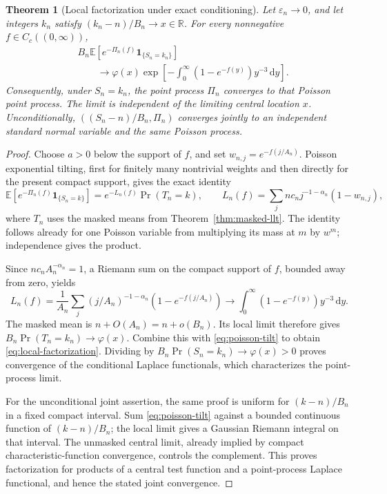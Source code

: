\documentclass[11pt,a4paper]{article}
\numberwithin{equation}{section}
\newtheorem{theorem}{Theorem}[section]
\theoremstyle{definition}
\theoremstyle{remark}
\newcommand{\R}{\mathbb R}
\newcommand{\E}{\mathbb E}
\newcommand{\eps}{\varepsilon}
\newcommand{\dd}{\,\mathrm d}
\newcommand{\ph}{\varphi}
\begin{document}
\begin{theorem}[Local factorization under exact conditioning]
\label{thm:ppp}
Let \(\eps_n\to0\), and let integers \(k_n\) satisfy
\((k_n-n)/B_n\to x\in\R\). For every nonnegative
\(f\in C_c((0,\infty))\),
\begin{align}
 &B_n\E\left[e^{-\Pi_n(f)}\mathbf1_{\{S_n=k_n\}}\right] \nonumber\\
 &\qquad\longrightarrow
 \ph(x)\exp\left[-\int_0^\infty(1-e^{-f(y)})y^{-3}\dd y\right].
 \label{eq:local-factorization}
\end{align}
Consequently, under \(S_n=k_n\), the point process \(\Pi_n\) converges to
that Poisson point process. The limit is independent of the limiting central
location \(x\). Unconditionally, \(((S_n-n)/B_n,\Pi_n)\) converges jointly
to an independent standard normal variable and the same Poisson process.
\end{theorem}
\begin{proof}
Choose \(a>0\) below the support of \(f\), and set
\(w_{n,j}=e^{-f(j/A_n)}\). Poisson exponential tilting, first for finitely
many nontrivial weights and then directly for the present compact support,
gives the exact identity
\begin{equation}
 \E[e^{-\Pi_n(f)}\mathbf1_{\{S_n=k\}}]
 =e^{-L_n(f)}\Pr(T_n=k),\qquad
 L_n(f)=\sum_jnc_nj^{-1-\alpha_n}(1-w_{n,j}),
 \label{eq:poisson-tilt}
\end{equation}
where \(T_n\) uses the masked means from
Theorem~\ref{thm:masked-llt}. The identity follows already for one Poisson
variable from multiplying its mass at \(m\) by \(w^m\); independence gives
the product.

Since \(nc_nA_n^{-\alpha_n}=1\), a Riemann sum on the compact support of
\(f\), bounded away from zero, yields
\begin{equation}
 L_n(f)=\frac1{A_n}\sum_j
 (j/A_n)^{-1-\alpha_n}(1-e^{-f(j/A_n)})
 \longrightarrow\int_0^\infty(1-e^{-f(y)})y^{-3}\dd y.
 \label{eq:tilt-riemann}
\end{equation}
The masked mean is \(n+O(A_n)=n+o(B_n)\). Its local limit therefore gives
\(B_n\Pr(T_n=k_n)\to\ph(x)\). Combine this with
\eqref{eq:poisson-tilt} to obtain \eqref{eq:local-factorization}. Dividing by
\(B_n\Pr(S_n=k_n)\to\ph(x)>0\) proves convergence of the conditional
Laplace functionals, which characterizes the point-process limit.

For the unconditional joint assertion, the same proof is uniform for
\((k-n)/B_n\) in a fixed compact interval. Sum
\eqref{eq:poisson-tilt} against a bounded continuous function of
\((k-n)/B_n\); the local limit gives a Gaussian Riemann integral on that
interval. The unmasked central limit, already implied by compact
characteristic-function convergence, controls the complement. This proves
factorization for products of a central test function and a point-process
Laplace functional, and hence the stated joint convergence.
\end{proof}
\end{document}
